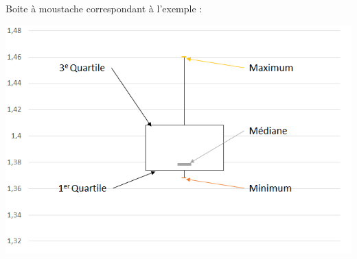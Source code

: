 \documentclass[12pt,a4paper]{article}
\begin{document}
\begin{myex}
	Boite à moustache correspondant à l'exemple :
		\begin{center}
		 \includegraphics[scale=0.67]{img/moustache}
	\end{center}
\end{myex}
\end{document}
